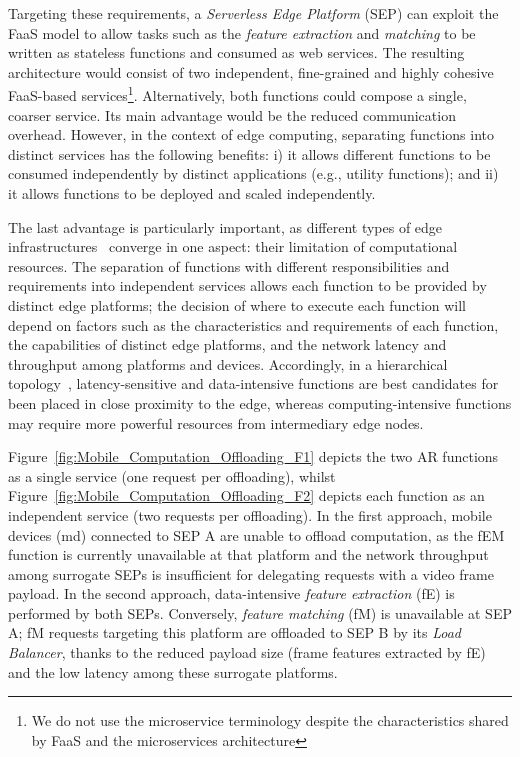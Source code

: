 Targeting these requirements, a \textit{Serverless Edge Platform} (SEP) can exploit the FaaS model to allow tasks such as the \textit{feature extraction} and \textit{matching} to be written as stateless functions and consumed as web services. The resulting architecture would consist of two independent, fine-grained and highly cohesive FaaS-based services\footnote{We do not use the microservice terminology despite the  characteristics shared by FaaS and the microservices architecture}. Alternatively, both functions could compose a single, coarser service. Its main advantage would be the reduced communication overhead. However, in the context of edge computing, separating functions into distinct services has the following benefits: i) it allows different functions to be consumed independently by distinct applications (e.g., utility functions); and ii) it allows functions to be deployed and scaled independently.%

The last advantage is particularly important, as different types of edge infrastructures~\cite{Satyanarayanan:2009,Taleb:2013,Liu:2014,K.Wang:2015} converge in one aspect: their limitation of computational resources. The separation of functions with different responsibilities and requirements into independent services allows each function to be provided by distinct edge platforms; the decision of where to execute each function will depend on factors such as the characteristics and requirements of each function, the capabilities of distinct edge platforms, and the network latency and throughput among platforms and devices. Accordingly, in a hierarchical topology~\cite{Liu:2014}, latency-sensitive and data-intensive functions are best candidates for been placed in close proximity to the edge, whereas computing-intensive functions may require more powerful resources from intermediary edge nodes. 

Figure~\ref{fig:Mobile_Computation_Offloading_F1} depicts the two AR functions as a single service (one request per offloading), whilst Figure~\ref{fig:Mobile_Computation_Offloading_F2} depicts each function as an independent service (two requests per offloading). 
In the first approach, mobile devices (md) connected to SEP A are unable to offload computation, as the fEM function is currently unavailable at that platform and the network throughput among surrogate SEPs is insufficient for delegating requests with a video frame payload.
In the second approach, data-intensive \textit{feature extraction} (fE) is performed by both SEPs. Conversely, \textit{feature matching} (fM) is unavailable at SEP A; fM requests targeting this platform are offloaded to SEP B by its \textit{Load Balancer},
thanks to the reduced payload size (frame features extracted by fE) and the low latency among these surrogate platforms. 



